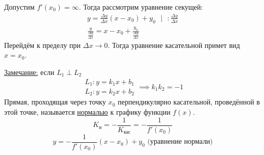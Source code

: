\documentclass[12pt]{article}
\begin{document}
    Допустим $f'(x_0) = \infty$. Тогда рассмотрим уравнение секущей:
    \begin{gather*}
        y = \frac{\Delta y}{\Delta x} (x-x_0) + y_0 \text{ } \big| \text{ } : \frac{\Delta y}{\Delta x}\\
        \frac{y}{\frac{\Delta y}{\Delta x}} = x - x_0 + \frac{y_0}{\frac{\Delta y}{\Delta x}}
    \end{gather*}
    Перейдём к пределу при $\Delta x \to 0$. Тогда уравнение касательной примет вид \underline{$x = x_0$}.\par\noindent
    \underline{Замечание:} если $L_1 \perp L_2$
    \[ \begin{matrix}
        L_1: y = k_1x + b_1\\
        L_2: y = k_2x + b_2
    \end{matrix} \implies k_1k_2 = -1 \]
    Прямая, проходящая через точку $x_0$ перпендикулярно касательной, проведённой в этой точке, называется \underline{нормалью} к графику функции $f(x)$.
    \[ K_\text{н} = -\frac{1}{K_\text{кас}} = -\frac{1}{f'(x_0)} \]
    \[ y = -\frac{1}{f'(x_0)}(x - x_0) + y_0 \text{ (уравнение нормали)} \]
\end{document}
